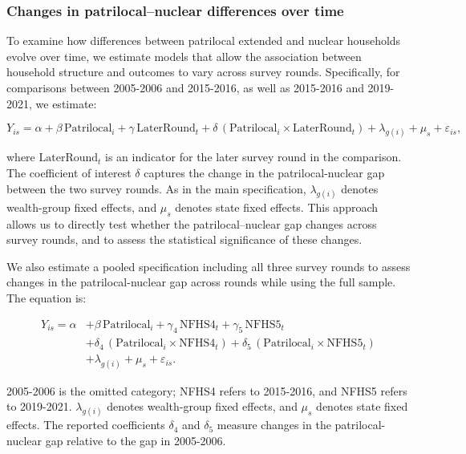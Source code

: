 \documentclass[10pt,twoside,reqno]{article}
\begin{document}
\subsubsection{Changes in patrilocal–nuclear differences over time}

To examine how differences between patrilocal extended and nuclear households evolve over time, we estimate models that allow the association between household structure and outcomes to vary across survey rounds. Specifically, for comparisons between 2005-2006 and 2015-2016, as well as 2015-2016 and 2019-2021, we estimate:

\begin{equation} \label{eq:tworounds}
Y_{is} = \alpha + \beta \,\text{Patrilocal}_i + \gamma \,\text{LaterRound}_t
+ \delta \,(\text{Patrilocal}_i \times \text{LaterRound}_t)
+ \lambda_{g(i)} + \mu_s + \varepsilon_{is},
\end{equation}


where $\text{LaterRound}_t$ is an indicator for the later survey round in the comparison. The coefficient of interest $\delta$ captures the change in the patrilocal-nuclear gap between the two survey rounds. As in the main specification, $\lambda_{g(i)}$ denotes wealth-group fixed effects, and $\mu_s$ denotes state fixed effects. This approach allows us to directly test whether the patrilocal–nuclear gap changes across survey rounds, and to assess the statistical significance of these changes.

We also estimate a pooled specification including all three survey rounds to assess changes in the patrilocal-nuclear gap across rounds while using the full sample. The equation is:

\begin{equation} \label{eq:stacked}
\begin{aligned}
Y_{is} = \alpha 
&+ \beta \,\text{Patrilocal}_i
+ \gamma_4 \,\text{NFHS4}_t
+ \gamma_5 \,\text{NFHS5}_t \\
&+ \delta_4 \,(\text{Patrilocal}_i \times \text{NFHS4}_t)
+ \delta_5 \,(\text{Patrilocal}_i \times \text{NFHS5}_t) \\
&+ \lambda_{g(i)} + \mu_s + \varepsilon_{is}.
\end{aligned}
\end{equation}

2005-2006 is the omitted category; NFHS4 refers to 2015-2016, and NFHS5 refers to 2019-2021. $\lambda_{g(i)}$ denotes wealth-group fixed effects, and $\mu_s$ denotes state fixed effects. The reported coefficients $\delta_4$ and $\delta_5$ measure changes in the patrilocal-nuclear gap relative to the gap in 2005-2006.
\end{document}
